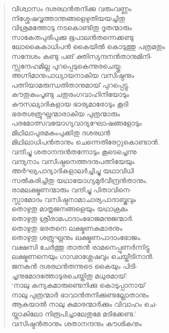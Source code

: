 \begin{verse}
വിശ്വാസം ദശരഥന്‍തനിക്കു വരുംവണ്ണം\\
നിശ്ശേഷവൃത്താന്തങ്ങളെഴുതിയയച്ചിതു\\
വിശ്രമത്തോടു നടകൊണ്ടിതു ദൂതന്മാരും\\
സാകേതപുരിപുക്കു ഭൂപാലന്‍തന്നെക്കണ്ടു\\
ലോകൈകാധിപന്‍ കൈയില്‍ കൊടുത്തു പത്രമതും\\
സന്ദേശം കണ്ടു പങ് ക്തിസ്യന്ദനന്‍താനുമിനി-\\
സ്സന്ദേഹമില്ല പുറപ്പെടുകെന്നുരചെയ്തു.\\
അഗ്നിമാനുപാധ്യായനാകിയ വസിഷ്ഠനും\\
പത്നിയാമരുന്ധതിതാനുമായ് പുറപ്പെട്ടു.\\
കൗതുകംപൂണ്ടു ചതുരംഗവാഹിനിയോടും\\
കൗസല്യാദികളായ ഭാര്യമാരോടും കൂടി\\
ഭരതശത്രുഘ്നന്മാരാകിയ പുത്രന്മാരും\\
പരമോത്സവയോഗ്യവാദ്യഘോഷങ്ങളോടും\\
മിഥിലാപുരമകംപുക്കിതു ദശരഥന്‍\\
മിഥിലാധിപന്‍താനും ചെന്നെതിരേറ്റുകൊണ്ടാന്‍.\\
വന്ദിച്ചു ശതാനന്ദന്‍തന്നോടും കൂടെച്ചെന്നു\\
വന്ദ്യനാം വസിഷ്ഠനെത്തദനുപത്നിയേയും\\
അര്‍ഘ്യപാദ്യാദികളാലര്‍ച്ചിച്ചു യഥാവിധി\\
സല്‍കരിച്ചിതു യഥായോഗ്യമുര്‍വീന്ദ്രന്‍താനും.\\
രാമലക്ഷ്മണന്മാരും വന്ദിച്ചു പിതാവിനെ-\\
സ്സാമോദം വസിഷ്ഠനാമാചാര്യപാദാബ്ജവും\\
തൊഴുതു മാതൃജനങ്ങളെയും യഥാക്രമം\\
തൊഴുതു ശ്രീരാമപാദാംഭോജമനുജന്മാര്‍.\\
തൊഴുതു ഭരതനെ ലക്ഷ്മണകുമാരനും\\
തൊഴുതു ശത്രുഘ്നനും ലക്ഷ്മണപാദാംഭോജം.\\
വക്ഷസി ചേര്‍ത്തു താതന്‍ രാമനെപ്പുണര്‍ന്നിട്ടു\\
ലക്ഷ്മണനെയും ഗാഢാശ്ലേഷവും ചെയ്തീടിനാന്‍.\\
ജനകന്‍ ദശരഥന്‍തന്നുടെ കൈയും പിടി-\\
ച്ചനുമോദത്തോടുരചെയ്തിതു മധുരമായ്:\\
‘നാലു കന്യകമാരുണ്ടെനിക്കു കൊടുപ്പാനായ്\\
നാലു പുത്രന്മാര്‍ ഭാവാന്‍തനിക്കുണ്ടല്ലോതാനും\\
ആകയാല്‍ നാലു കുമാരന്മാര്‍ക്കും വിവാഹം ചെ-\\
യ്താകിലോ നിരൂപിച്ചാലേതുമേ മടിക്കേണ്ട.’\\
വസിഷ്ഠന്‍താനും ശതാനന്ദനും കൗശികനും\\

\end{verse}
